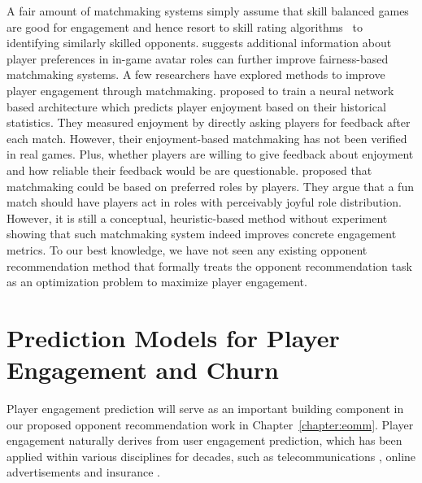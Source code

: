 A fair amount of matchmaking systems simply assume that skill balanced games are good for engagement \cite{graepel2006ranking,sweetser2005gameflow,flow1990psychology,chen2007flow} and hence resort to skill rating algorithms~\cite{glickman1999parameter,elo1978rating,herbrich:trueskill} to identifying similarly skilled opponents. \cite{myslak2014developing} suggests additional information about player preferences in in-game avatar roles can further improve fairness-based matchmaking systems. A few researchers have explored methods to improve player engagement through matchmaking. \cite{Delalleau2012} proposed to train a neural network based architecture which predicts player enjoyment based on their historical statistics. They measured enjoyment by directly asking players for feedback after each match. However, their enjoyment-based matchmaking has not been verified in real games. Plus, whether players are willing to give feedback about enjoyment and how reliable their feedback would be are questionable. \cite{jimenez2011matchmaking} proposed that matchmaking could be based on preferred roles by players. They argue that a fun match should have players act in  roles with perceivably joyful role distribution. However, it is still a conceptual, heuristic-based method without experiment showing that such matchmaking system indeed improves concrete engagement metrics. To our best knowledge, we have not seen any existing opponent recommendation method that formally treats the opponent recommendation task as an optimization problem to maximize player engagement. 




\section{Prediction Models for Player Engagement and Churn}


Player engagement prediction will serve as an important building component in our proposed opponent recommendation work in Chapter~\ref{chapter:eomm}. Player engagement naturally derives from user engagement prediction, which has been applied within various disciplines for decades, such as telecommunications \cite{ferreira2004data}, online advertisements \cite{yoon2010prediction} and insurance \cite{morik2004analysing}. 

